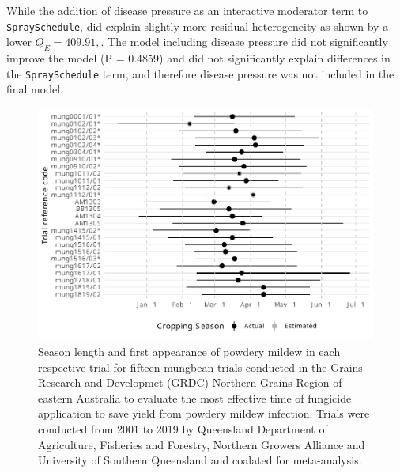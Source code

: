 \documentclass[agronomy,article,submit,moreauthors,pdftex]{mdpi}
\begin{document}
While the addition of disease pressure as an interactive moderator term to \texttt{SpraySchedule}, did explain slightly more residual heterogeneity as shown by a lower \(Q_E = 409.91,\).
The model including disease pressure did not significantly improve the model (P = 0.4859) and did not significantly explain differences in the \texttt{SpraySchedule} term, and therefore disease pressure was not included in the final model.

\begin{figure}
\centering
\includegraphics{paper_files/figure-latex/Figure2-1.pdf}
\caption{\label{fig:Figure2}Season length and first appearance of powdery mildew in each respective trial for fifteen mungbean trials conducted in the Grains Research and Developmet (GRDC) Northern Grains Region of eastern Australia to evaluate the most effective time of fungicide application to save yield from powdery mildew infection. Trials were conducted from 2001 to 2019 by Queensland Department of Agriculture, Fisheries and Forestry, Northern Growers Alliance and University of Southern Queensland and coalated for meta-analysis.}
\end{figure}
\end{document}
